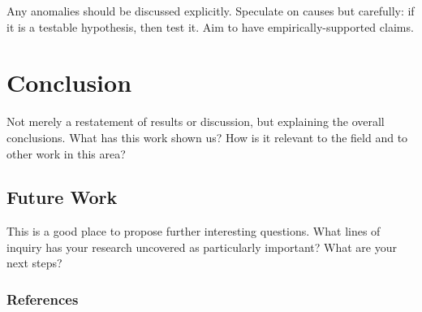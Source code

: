 \documentclass{article} %
\begin{document}
Any anomalies should be discussed explicitly. Speculate on causes but carefully: if it is a testable hypothesis, then test it. Aim to have empirically-supported claims.

\section{Conclusion}
Not merely a restatement of results or discussion, but explaining the overall conclusions. What has this work shown us? How is it relevant to the field and to other work in this area?

\subsection{Future Work}
\label{sec:future}
This is a good place to propose further interesting questions. What lines of inquiry has your research uncovered as particularly important? What are your next steps?


\subsubsection*{References}

\end{document}
